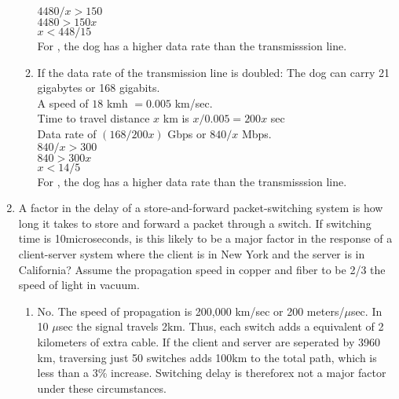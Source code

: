 \documentclass[12pt]{article}
\begin{document}
\begin{enumerate}
\begin{enumerate}
    $4480/x > 150$ \\
    $4480 > 150x$ \\
    $x < 448/15$ \\ 
    For , the dog has a higher data rate than the transmisssion line.
  \item If the data rate of the transmission line is doubled:
    The dog can carry 21 gigabytes or 168 gigabits. \\
    A speed of $18$ kmh $= 0.005$ km/sec. \\
    Time to travel distance $x$ km is $x/0.005 = 200x$ sec\\ 
    Data rate of $(168/200x)$ Gbps or $840/x$ Mbps. \\
    $840/x > 300$ \\
    $840 > 300x$ \\
    $x < 14/5$ \\ 
    For , the dog has a higher data rate than the transmisssion line.
  \end{enumerate}

\item A factor in the delay of a store-and-forward packet-switching system is how long it takes to store and forward a packet through a switch. If switching time is 10microseconds, is this likely to be a major factor in the response of a client-server system where the client is in New York and the server is in California? Assume the propagation speed in copper and fiber to be 2/3 the speed of light in vacuum. 
  \begin{enumerate}
    \item No. The speed of propagation is 200,000 km/sec or 200 meters/$\mu$sec. In 10 $\mu$sec the signal travels 2km. Thus, each switch adds a equivalent of 2 kilometers of extra cable. If the client and server are seperated by 3960 km, traversing just 50 switches adds 100km to the total path, which is less than a 3\% increase. Switching delay is thereforex not a major factor under these circumstances.
  \end{enumerate}


\end{enumerate}
\end{document}
